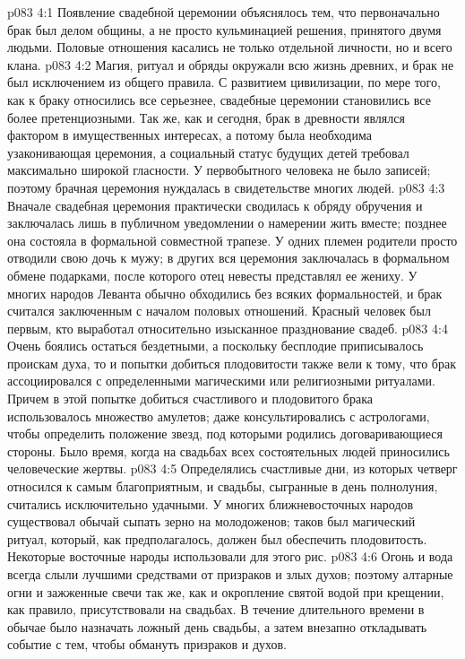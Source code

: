 \vs p083 4:1 Появление свадебной церемонии объяснялось тем, что первоначально брак был делом общины, а не просто кульминацией решения, принятого двумя людьми. Половые отношения касались не только отдельной личности, но и всего клана.
\vs p083 4:2 \pc Магия, ритуал и обряды окружали всю жизнь древних, и брак не был исключением из общего правила. С развитием цивилизации, по мере того, как к браку относились все серьезнее, свадебные церемонии становились все более претенциозными. Так же, как и сегодня, брак в древности являлся фактором в имущественных интересах, а потому была необходима узаконивающая церемония, а социальный статус будущих детей требовал максимально широкой гласности. У первобытного человека не было записей; поэтому брачная церемония нуждалась в свидетельстве многих людей.
\vs p083 4:3 Вначале свадебная церемония практически сводилась к обряду обручения и заключалась лишь в публичном уведомлении о намерении жить вместе; позднее она состояла в формальной совместной трапезе. У одних племен родители просто отводили свою дочь к мужу; в других вся церемония заключалась в формальном обмене подарками, после которого отец невесты представлял ее жениху. У многих народов Леванта обычно обходились без всяких формальностей, и брак считался заключенным с началом половых отношений. Красный человек был первым, кто выработал относительно изысканное празднование свадеб.
\vs p083 4:4 \pc Очень боялись остаться бездетными, а поскольку бесплодие приписывалось проискам духа, то и попытки добиться плодовитости также вели к тому, что брак ассоциировался с определенными магическими или религиозными ритуалами. Причем в этой попытке добиться счастливого и плодовитого брака использовалось множество амулетов; даже консультировались с астрологами, чтобы определить положение звезд, под которыми родились договаривающиеся стороны. Было время, когда на свадьбах всех состоятельных людей приносились человеческие жертвы.
\vs p083 4:5 Определялись счастливые дни, из которых четверг относился к самым благоприятным, и свадьбы, сыгранные в день полнолуния, считались исключительно удачными. У многих ближневосточных народов существовал обычай сыпать зерно на молодоженов; таков был магический ритуал, который, как предполагалось, должен был обеспечить плодовитость. Некоторые восточные народы использовали для этого рис.
\vs p083 4:6 Огонь и вода всегда слыли лучшими средствами от призраков и злых духов; поэтому алтарные огни и зажженные свечи так же, как и окропление святой водой при крещении, как правило, присутствовали на свадьбах. В течение длительного времени в обычае было назначать ложный день свадьбы, а затем внезапно откладывать событие с тем, чтобы обмануть призраков и духов.
